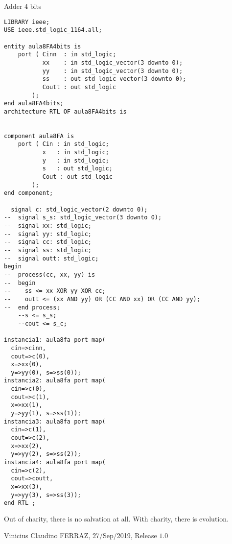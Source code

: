 \documentclass[12pt]{article}
\begin{document}
\vspace{3mm}

\Large

\begin{center}
Adder 4 bits
\end{center}

\normalsize

\begin{verbatim}
LIBRARY ieee;
USE ieee.std_logic_1164.all;

entity aula8FA4bits is
    port ( Cinn  : in std_logic;
           xx    : in std_logic_vector(3 downto 0);
           yy    : in std_logic_vector(3 downto 0);
           ss    : out std_logic_vector(3 downto 0);
           Coutt : out std_logic
        );
end aula8FA4bits;
architecture RTL OF aula8FA4bits is


component aula8FA is
    port ( Cin : in std_logic;
           x   : in std_logic;
           y   : in std_logic;
           s   : out std_logic;
           Cout : out std_logic
        );
end component;

  signal c: std_logic_vector(2 downto 0);
--  signal s_s: std_logic_vector(3 downto 0);
--  signal xx: std_logic;
--  signal yy: std_logic;
--  signal cc: std_logic;
--  signal ss: std_logic;
--  signal outt: std_logic;
begin
--	process(cc, xx, yy) is
--	begin
--    ss <= xx XOR yy XOR cc;
--    outt <= (xx AND yy) OR (CC AND xx) OR (CC AND yy);
--	end process;
	--s <= s_s;
	--cout <= s_c;

instancia1: aula8fa port map(
  cin=>cinn,
  cout=>c(0),
  x=>xx(0),
  y=>yy(0), s=>ss(0));
instancia2: aula8fa port map(
  cin=>c(0),
  cout=>c(1),
  x=>xx(1),
  y=>yy(1), s=>ss(1));
instancia3: aula8fa port map(
  cin=>c(1),
  cout=>c(2),
  x=>xx(2),
  y=>yy(2), s=>ss(2));
instancia4: aula8fa port map(
  cin=>c(2),
  cout=>coutt,
  x=>xx(3),
  y=>yy(3), s=>ss(3));
end RTL ;
\end{verbatim}

\vspace{3mm}

Out of charity, there is no salvation at all. With charity, there is evolution.

\vspace{3mm}

Vinicius Claudino FERRAZ, 27/Sep/2019, Release $1.0$
\end{document}
